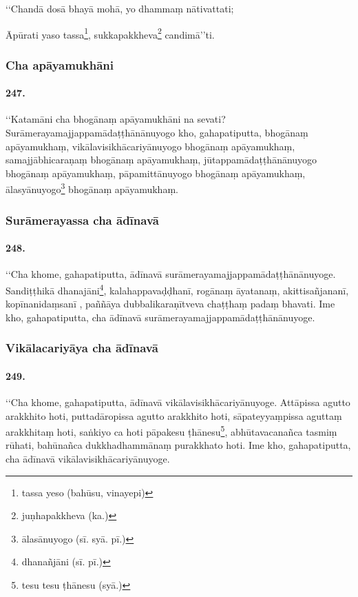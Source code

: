 ‘‘Chandā dosā bhayā mohā, yo dhammaṃ nātivattati;

Āpūrati yaso tassa\footnote{tassa yeso (bahūsu, vinayepi)}, sukkapakkheva\footnote{juṇhapakkheva (ka.)} candimā’’ti.

\subsubsection{Cha apāyamukhāni}

\paragraph{247.} ‘‘Katamāni cha bhogānaṃ apāyamukhāni na sevati? Surāmerayamajjappamādaṭṭhānānuyogo kho, gahapatiputta, bhogānaṃ apāyamukhaṃ, vikālavisikhācariyānuyogo bhogānaṃ apāyamukhaṃ, samajjābhicaraṇaṃ bhogānaṃ apāyamukhaṃ, jūtappamādaṭṭhānānuyogo bhogānaṃ apāyamukhaṃ, pāpamittānuyogo bhogānaṃ apāyamukhaṃ, ālasyānuyogo\footnote{ālasānuyogo (sī. syā. pī.)} bhogānaṃ apāyamukhaṃ.

\subsubsection{Surāmerayassa cha ādīnavā}

\paragraph{248.} ‘‘Cha khome, gahapatiputta, ādīnavā surāmerayamajjappamādaṭṭhānānuyoge. Sandiṭṭhikā dhanajāni\footnote{dhanañjāni (sī. pī.)}, kalahappavaḍḍhanī, rogānaṃ āyatanaṃ, akittisañjananī, kopīnanidaṃsanī , paññāya dubbalikaraṇītveva chaṭṭhaṃ padaṃ bhavati. Ime kho, gahapatiputta, cha ādīnavā surāmerayamajjappamādaṭṭhānānuyoge.

\subsubsection{Vikālacariyāya cha ādīnavā}

\paragraph{249.} ‘‘Cha khome, gahapatiputta, ādīnavā vikālavisikhācariyānuyoge. Attāpissa agutto arakkhito hoti, puttadāropissa agutto arakkhito hoti, sāpateyyaṃpissa aguttaṃ arakkhitaṃ hoti, saṅkiyo ca hoti pāpakesu ṭhānesu\footnote{tesu tesu ṭhānesu (syā.)}, abhūtavacanañca tasmiṃ rūhati, bahūnañca dukkhadhammānaṃ purakkhato hoti. Ime kho, gahapatiputta, cha ādīnavā vikālavisikhācariyānuyoge.

